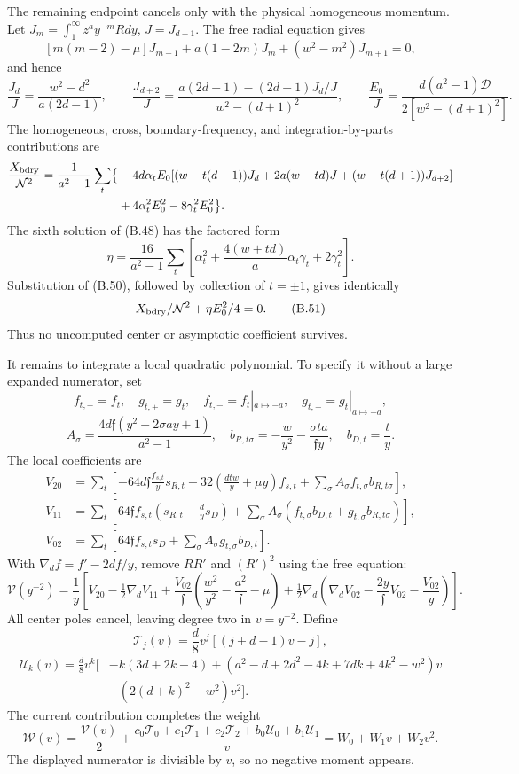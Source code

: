 \documentclass[a4paper,11pt]{article}
\numberwithin{equation}{section}
\begin{document}
The remaining endpoint cancels only with the physical homogeneous momentum. Let \(J_m=\int_1^\infty z^ay^{-m}Rdy\), \(J=J_{d+1}\). The free radial equation gives \[
[m(m-2)-\mu]J_{m-1}+a(1-2m)J_m+(w^2-m^2)J_{m+1}=0,
\] and hence \[
\frac{J_d}{J}=\frac{w^2-d^2}{a(2d-1)},\qquad
\frac{J_{d+2}}J=
\frac{a(2d+1)-(2d-1)J_d/J}{w^2-(d+1)^2},\qquad
\frac{E_0}{J}=\frac{d(a^2-1)\mathcal D}{2[w^2-(d+1)^2]}.
\tag{B.50}
\] The homogeneous, cross, boundary-frequency, and integration-by-parts contributions are \[
\begin{aligned}
\frac{X_{\rm bdry}}{\mathcal N^2}
=\frac1{a^2-1}\sum_t\bigl\{
&-4d\alpha_tE_0[(w-t(d-1))J_d
+2a(w-td)J+(w-t(d+1))J_{d+2}]\\
&+4\alpha_t^2E_0^2-8\gamma_t^2E_0^2\bigr\}.
\end{aligned}
\] The sixth solution of (B.48) has the factored form \[
\eta=\frac{16}{a^2-1}
\sum_t\left[\alpha_t^2+
\frac{4(w+td)}a\alpha_t\gamma_t+2\gamma_t^2\right].
\] Substitution of (B.50), followed by collection of \(t=\pm1\), gives identically \[
X_{\rm bdry}/\mathcal N^2+\eta E_0^2/4=0 .
\tag{B.51}
\] Thus no uncomputed center or asymptotic coefficient survives.

It remains to integrate a local quadratic polynomial. To specify it without a large expanded numerator, set \[
f_{t,+}=f_t,\quad g_{t,+}=g_t,\quad
f_{t,-}=f_t|_{a\mapsto-a},\quad
g_{t,-}=g_t|_{a\mapsto-a},
\] \[
A_\sigma=\frac{4d\mathfrak f(y^2-2\sigma ay+1)}{a^2-1},
\quad b_{R,t\sigma}=-\frac w{y^2}-\frac{\sigma ta}{\mathfrak f y},
\quad b_{D,t}=\frac t y.
\] The local coefficients are \[
\begin{aligned}
V_{20}&=\sum_t\left[
-64d\mathfrak f\frac{f_{s,t}}y s_{R,t}
+32\left(\frac{dtw}y+\mu y\right)f_{s,t}
+\sum_\sigma A_\sigma f_{t,\sigma}b_{R,t\sigma}\right],\\
V_{11}&=\sum_t\left[
64\mathfrak f f_{s,t}\left(s_{R,t}-\frac d y s_D\right)
+\sum_\sigma A_\sigma(f_{t,\sigma}b_{D,t}+g_{t,\sigma}b_{R,t\sigma})\right],\\
V_{02}&=\sum_t\left[
64\mathfrak f f_{s,t}s_D+\sum_\sigma A_\sigma g_{t,\sigma}b_{D,t}\right].
\end{aligned}
\] With \(\nabla_d f=f'-2df/y\), remove \(RR'\) and \((R')^2\) using the free equation: \[
\mathcal V(y^{-2})=\frac1y\left[
V_{20}-\tfrac12\nabla_dV_{11}
+\frac{V_{02}}{\mathfrak f}
\left(\frac{w^2}{y^2}-\frac{a^2}{\mathfrak f}-\mu\right)
+\tfrac12\nabla_d\left(\nabla_dV_{02}
-\frac{2y}{\mathfrak f}V_{02}-\frac{V_{02}}y\right)\right].
\tag{B.52}
\] All center poles cancel, leaving degree two in \(v=y^{-2}\). Define \[
\mathcal T_j(v)=\frac d8v^j[(j+d-1)v-j],
\] \[
\begin{aligned}
\mathcal U_k(v)=\frac d8v^k\big[
&
-k(3d+2k-4)
+(a^2-d+2d^2-4k+7dk+4k^2-w^2)v
\\&-(2(d+k)^2-w^2)v^2\big].
\end{aligned}
\] The current contribution completes the weight \[
\mathcal W(v)=\frac{\mathcal V(v)}2+
\frac{c_0\mathcal T_0+c_1\mathcal T_1+c_2\mathcal T_2
+b_0\mathcal U_0+b_1\mathcal U_1}{v}
=W_0+W_1v+W_2v^2 .
\tag{B.53}
\] The displayed numerator is divisible by \(v\), so no negative moment appears.
\end{document}
